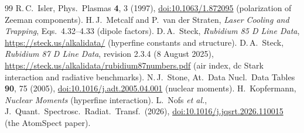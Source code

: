 \documentclass[11pt,a4paper]{article}
\newcommand{\doiurl}[1]{\href{https://doi.org/#1}{doi:#1}}
\numberwithin{equation}{section}
\begin{document}
\clearpage
\begin{thebibliography}{99}
 R.\,C.\ Isler, Phys.\ Plasmas \textbf{4}, 3 (1997),
  \doiurl{10.1063/1.872095} (polarization of Zeeman components).
 H.\,J.\ Metcalf and P.\ van der Straten,
  \emph{Laser Cooling and Trapping}, Eqs.\ 4.32--4.33 (dipole factors).
 D.\,A.\ Steck, \emph{Rubidium 85 D Line Data},
  \url{https://steck.us/alkalidata/} (hyperfine constants and structure).
 D.\,A.\ Steck, \emph{Rubidium 87 D Line Data}, revision 2.3.4 (8 August 2025),
  \url{https://steck.us/alkalidata/rubidium87numbers.pdf} (air index, dc Stark interaction and radiative benchmarks).
 N.\,J.\ Stone, At.\ Data Nucl.\ Data Tables \textbf{90},
  75 (2005), \doiurl{10.1016/j.adt.2005.04.001} (nuclear moments).
 H.\ Kopfermann, \emph{Nuclear Moments}
  (hyperfine interaction).
 L.\ Nofs \emph{et al.}, J.\ Quant.\ Spectrosc.\ Radiat.\
  Transf.\ (2026), \doiurl{10.1016/j.jqsrt.2026.110015}
  (the AtomSpect paper).
\end{thebibliography}
\end{document}
